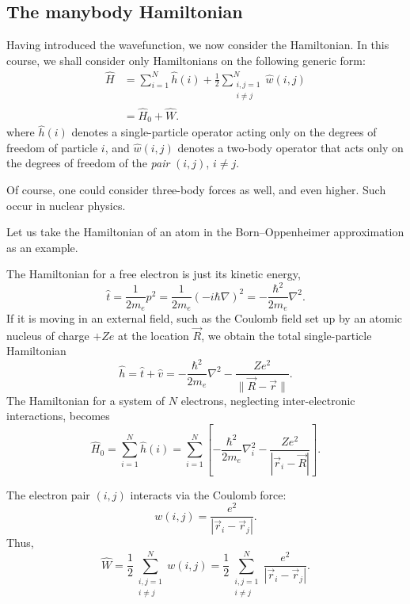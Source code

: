 \documentclass{report}
\theoremstyle{plain}
\theoremstyle{definition}
\begin{document}
  

\subsection{The manybody Hamiltonian}
Having introduced the wavefunction, we now consider the Hamiltonian.
In this course, we shall consider only Hamiltonians on the following
generic form:
\begin{equation}
  \begin{split}
    \hat{H} &= \sum_{i=1}^N \hat{h}(i) + \frac{1}{2}\sum_{\substack{i,j=1\\i\neq j}}^N 
    \hat{w}(i,j) \\ 
    &= \hat{H}_0 + \hat{W}.
  \end{split}
\end{equation}
where $\hat{h}(i)$ denotes a single-particle operator acting only on
the degrees of freedom of particle $i$, and $\hat{w}(i,j)$ denotes a
two-body operator that acts only on the degrees of freedom of the
\emph{pair} $(i,j)$, $i\neq j$.

Of course, one could consider three-body forces as well, and even
higher. Such occur in nuclear physics.

Let us take the Hamiltonian of an atom in the Born--Oppenheimer
approximation as an example.

The Hamiltonian for a free electron is just its kinetic energy,
\begin{equation}
  \hat{t} = \frac{1}{2m_e} p^2 = \frac{1}{2m_e}
  (-i\hbar\nabla)^2 = -\frac{\hbar^2}{2m_e}\nabla^2.
\end{equation}
If it is moving in an external field, such as the Coulomb field set up
by an atomic nucleus of charge $+Ze$ at the location $\vec{R}$, we
obtain the total single-particle Hamiltonian
\begin{equation}
  \hat{h} = \hat{t} + \hat{v}  =
  -\frac{\hbar^2}{2m_e}\nabla^2   - \frac{Ze^2}{\|\vec{R}-\vec{r}\|}.
\end{equation}
The Hamiltonian for a system of $N$ electrons, neglecting
inter-electronic interactions, becomes
\begin{equation}
  \hat{H}_0 = \sum_{i=1}^N \hat{h}(i) = \sum_{i=1}^N
  \left[-\frac{\hbar^2}{2m_e} \nabla_i^2 -\frac{Ze^2}{|\vec{r}_i - \vec{R}|}\right].
\end{equation}

The electron pair $(i,j)$ interacts via the Coulomb force:
\begin{equation}
  w(i,j) = \frac{e^2}{|\vec{r}_i - \vec{r}_j|}.
\end{equation}
Thus,
\begin{equation}
  \hat{W} = \frac{1}{2}\sum_{\substack{i,j=1\\i\neq j}}^N w(i,j) =
  \frac{1}{2}\sum_{\substack{i,j=1\\i\neq j}}^N \frac{e^2}{|\vec{r}_i -
    \vec{r}_j|}.
\end{equation}
\end{document}
